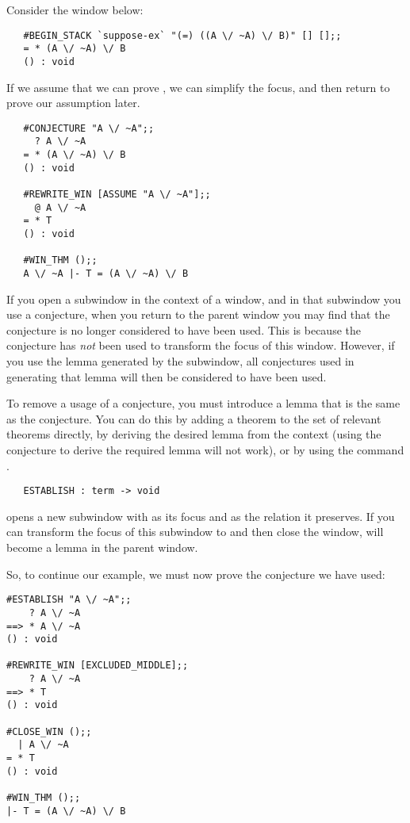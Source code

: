 Consider the window below:
\setcounter{sessioncount}{1}
\begin{session}\begin{verbatim}
   #BEGIN_STACK `suppose-ex` "(=) ((A \/ ~A) \/ B)" [] [];;
   = * (A \/ ~A) \/ B
   () : void
\end{verbatim}\end{session}
If we assume that we can prove ,
we can simplify the focus, and then return to prove our assumption later.
\begin{session}\begin{verbatim}
   #CONJECTURE "A \/ ~A";;
     ? A \/ ~A
   = * (A \/ ~A) \/ B
   () : void
   
   #REWRITE_WIN [ASSUME "A \/ ~A"];;
     @ A \/ ~A
   = * T
   () : void

   #WIN_THM ();;
   A \/ ~A |- T = (A \/ ~A) \/ B
\end{verbatim}\end{session}

If you open a subwindow in the context of a window,
and in that subwindow you use a conjecture,
when you return to the parent window you may find that the conjecture is no
longer considered to have been used.
This is because the conjecture has {\it not\/} been used to transform the
focus of this window.
However, if you use the lemma generated by the subwindow,
all conjectures used in generating that lemma will then be
considered to have been used.

To remove a usage of a conjecture, you must introduce a lemma that is
the same as the conjecture.
You can do this by adding a theorem to the set of relevant theorems directly,
by deriving the desired lemma from the context
(using the conjecture to derive the required lemma will not work),
or by using the command .
\begin{boxed}\begin{verbatim}
   ESTABLISH : term -> void
\end{verbatim}\end{boxed}
 opens a new subwindow with  as its focus and
 as the relation it preserves.
If you can transform the focus of this subwindow to  and then
close the window,  will become a lemma in the parent window.

So, to continue our example, we must now prove the conjecture we have used:
\begin{session}\begin{verbatim}
#ESTABLISH "A \/ ~A";;
    ? A \/ ~A
==> * A \/ ~A
() : void

#REWRITE_WIN [EXCLUDED_MIDDLE];;
    ? A \/ ~A
==> * T
() : void

#CLOSE_WIN ();;
  | A \/ ~A
= * T
() : void

#WIN_THM ();;
|- T = (A \/ ~A) \/ B
\end{verbatim}\end{session}

